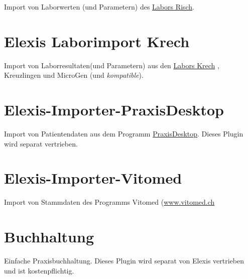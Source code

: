 Import von Laborwerten (und Parametern) des \href{http://www.risch.ch}{Labors Risch}.

\section{Elexis Laborimport Krech}

Import von Laborresultaten(und Parametern) aus den \href{http://www.labor.ch}{Labors Krech} , Kreuzlingen und MicroGen (und \textit{kompatible}).

\section{Elexis-Importer-PraxisDesktop}

Import von Patientendaten aus dem Programm \href{http://www.praxisdesktop.ch}{PraxisDesktop}. Dieses Plugin wird separat vertrieben.


 \section{Elexis-Importer-Vitomed}

 Import von Stammdaten des Programms Vitomed (\href{http://www.vitomed.ch}{www.vitomed.ch}


\section{Buchhaltung}
Einfache Praxisbuchhaltung. Dieses Plugin wird separat von Elexis vertrieben und ist kostenpflichtig. 